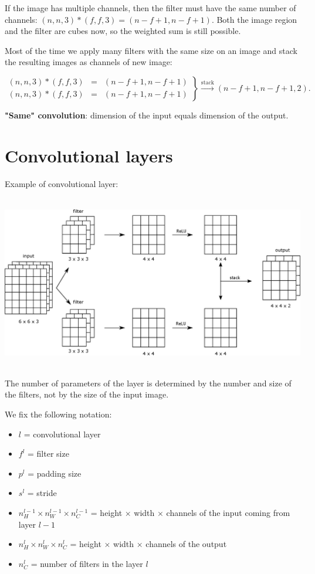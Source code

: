 \documentclass[a4paper,11pt]{report}
\begin{document}
If the image has multiple channels, then the filter must have the same number of channels: $(n,n,3) * (f,f,3) = (n-f+1, n-f+1)$. Both the image region and the filter are cubes now, so the weighted sum is still possible.

Most of the time we apply many filters with the same size on an image and stack the resulting images as channels of new image:

$$\left.\begin{array}{ccc}
  (n,n,3) * (f,f,3) & = & (n-f+1, n-f+1)\\
  (n,n,3) * (f,f,3) & = & (n-f+1, n-f+1)
\end{array}\right\}\xrightarrow[]{\text{stack}} (n-f+1, n-f+1, 2).$$

\textbf{"Same" convolution}: dimension of the input equals dimension of the output.

\section{Convolutional layers}

Example of convolutional layer:

\begin{center}
\includegraphics[height = 3in]{convolutions/convlayer}
\end{center}

The number of parameters of the layer is determined by the number and size of the filters, not by the size of the input image.

We fix the following notation:
\begin{itemize}
  \item $l$ = convolutional layer
  \item $f^l$  = filter size
  \item $p^l$ = padding size
  \item $s^l$ = stride
  \item $n_H^{l-1} \times n_W^{l-1} \times n_C^{l-1}$ = height $\times$ width $\times$ channels of the input coming from layer $l-1$
  \item $n_H^{l} \times n_W^{l} \times n_C^{l}$  = height $\times$ width $\times$ channels of the output
  \item $n_C^l$ = number of filters in the layer $l$
\end{itemize}
\break
\end{document}
